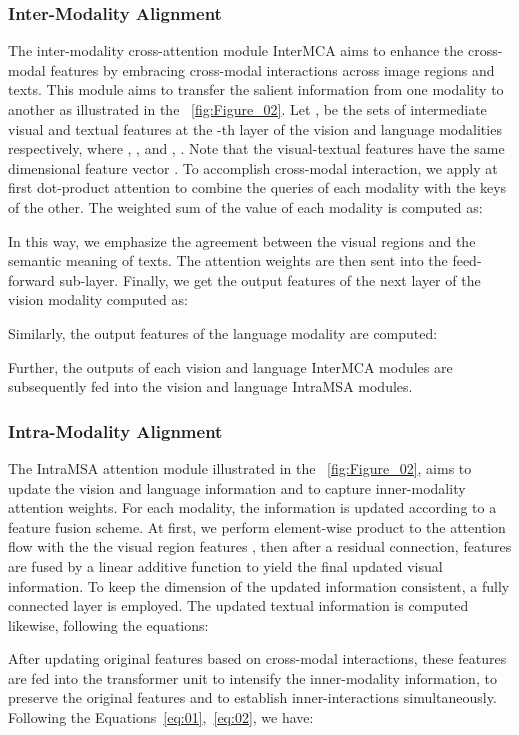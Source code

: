 \documentclass[preprint,review,12pt]{elsarticle}
\begin{document}
\subsubsection{Inter-Modality Alignment}
The inter-modality cross-attention module InterMCA aims to enhance the cross-modal features by embracing cross-modal interactions across image regions and texts. This module aims to transfer the salient information from one modality to another as illustrated in the \figurename~\ref{fig:Figure_02}. Let ,  be the sets of intermediate visual and textual features at the -th layer of the vision and language modalities respectively, where , , and , . Note that the visual-textual features have the same dimensional feature vector . To accomplish cross-modal interaction, we apply at first dot-product attention to combine the queries of each modality with the keys of the other. The weighted sum of the value of each modality is computed as:
\small

\normalsize
In this way, we emphasize the agreement between the visual regions and the semantic meaning of texts. The attention weights are then sent into the feed-forward sub-layer. Finally, we get the output features of the next layer of the vision modality  computed as: 
\small

\normalsize
Similarly, the output features  of the language modality are computed:
\small

\normalsize
Further, the outputs of each vision and language InterMCA modules are subsequently fed into the vision and language IntraMSA modules.

\subsubsection{Intra-Modality Alignment}
The IntraMSA attention module illustrated in the \figurename~\ref{fig:Figure_02}, aims to update the vision and language information and to capture inner-modality attention weights. For each modality, the information is updated according to a feature fusion scheme. At first, we perform element-wise product to the attention flow  with the the visual region features , then after a residual connection, features are fused by a linear additive function to yield the final updated visual information. To keep the dimension of the updated information consistent, a fully connected  layer is employed. The updated textual information is computed likewise, following the equations:
\small

\normalsize
After updating original features based on cross-modal interactions, these features
are fed into the transformer unit to intensify the inner-modality information, to preserve the original features and to establish inner-interactions simultaneously. Following the Equations~\ref{eq:01},~\ref{eq:02}, we have: 
\small
\end{document}
